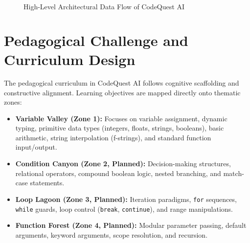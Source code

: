 \begin{figure}[htbp]
    \centering
    \begin{minipage}{0.9\textwidth}
        \centering
        \setlength{\fboxsep}{10pt}
        \setlength{\fboxrule}{0.8pt}
    \end{minipage}
    \caption{High-Level Architectural Data Flow of CodeQuest AI}
    \label{fig:arch_flow}
\end{figure}

\section{Pedagogical Challenge and Curriculum Design}
The pedagogical curriculum in CodeQuest AI follows cognitive scaffolding and constructive alignment. Learning objectives are mapped directly onto thematic zones:
\begin{itemize}
    \item \textbf{Variable Valley (Zone 1):} Focuses on variable assignment, dynamic typing, primitive data types (integers, floats, strings, booleans), basic arithmetic, string interpolation (f-strings), and standard function input/output.
    \item \textbf{Condition Canyon (Zone 2, Planned):} Decision-making structures, relational operators, compound boolean logic, nested branching, and match-case statements.
    \item \textbf{Loop Lagoon (Zone 3, Planned):} Iteration paradigms, \texttt{for} sequences, \texttt{while} guards, loop control (\texttt{break}, \texttt{continue}), and range manipulations.
    \item \textbf{Function Forest (Zone 4, Planned):} Modular parameter passing, default arguments, keyword arguments, scope resolution, and recursion.
\end{itemize}

